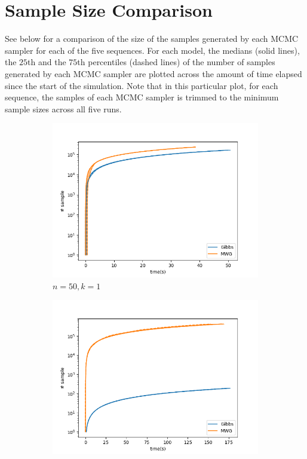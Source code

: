 \section{Sample Size Comparison}\label{appendix:sample}
See below for a comparison of the size of the samples generated by each MCMC sampler for each of the five sequences. For each model, the medians (solid lines), the $25$th and the $75$th percentiles (dashed lines) of the number of samples generated by each MCMC sampler are plotted across the amount of time elapsed since the start of the simulation. Note that in this particular plot, for each sequence, the samples of each MCMC sampler is trimmed to the minimum sample sizes across all five runs.
\begin{figure}[H]
    \centering
    \begin{subfigure}{.3\textwidth}
    	\centering
        \includegraphics[width=\linewidth]{../../plots/SampleTime_M2_N50_NMCMC1_seed0_diffind2.png}
        \caption{$n=50, k=1$}
    \end{subfigure}
    \begin{subfigure}{.3\textwidth}
        \centering
    	\includegraphics[width=\linewidth]{../../plots/SampleTime_M2_N20000_NMCMC3_seed0_diffind2.png}

\end{subfigure}
\end{figure}
